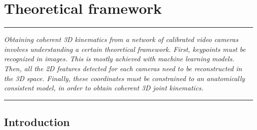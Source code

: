 
\lhead[\fancyplain{}{\leftmark}]%
      {\fancyplain{}{}} %
\chead[\fancyplain{}{}]%
      {\fancyplain{}{}}
\rhead[\fancyplain{}{}]%
      {\fancyplain{}{\rightmark}}%
\lfoot[\fancyplain{}{}]%
      {\fancyplain{}{}}
\cfoot[\fancyplain{}{\thepage}]%
      {\fancyplain{}{\thepage}} %
\rfoot[\fancyplain{}{}]%
     {\fancyplain{}{\scriptsize}}



\chapter{Theoretical framework}
\label{ch:2}


\begin{center}
\rule{0.7\linewidth}{.5pt}
\begin{minipage}{0.7\linewidth}
\smallskip

\textit{Obtaining coherent 3D kinematics from a network of calibrated video cameras involves understanding a certain theoretical framework. First, keypoints must be recognized in images. This is mostly achieved with machine learning models. Then, all the 2D features detected for each cameras need to be reconstructed in the 3D space. Finally, these coordinates must be constrained to an anatomically consistent model, in order to obtain coherent 3D joint kinematics.}

\end{minipage}
\smallskip
\rule{0.7\linewidth}{.5pt}
\end{center}

\minitoc
\newpage

\section{Introduction}

